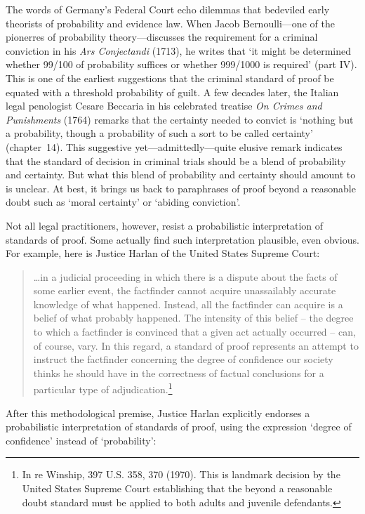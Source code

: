 \documentclass[10pt,dvipsnames,enabledeprecatedfontcommands]{scrartcl}
\begin{document}
The words of Germany's Federal Court echo dilemmas that bedeviled early
theorists of probability and evidence law. When Jacob Bernoulli---one of
the pionerres of probability theory---discusses the requirement for a
criminal conviction in his \textit{Ars Conjectandi} (1713), he writes
that `it might be determined whether 99/100 of probability suffices or
whether 999/1000 is required' (part IV). This is one of the earliest
suggestions that the criminal standard of proof be equated with a
threshold probability of guilt. A few decades later, the Italian legal
penologist Cesare Beccaria in his celebrated treatise
\textit{On Crimes and Punishments} (1764) remarks that the certainty
needed to convict is `nothing but a probability, though a probability of
such a sort to be called certainty' (chapter~14). This suggestive
yet---admittedly---quite elusive remark indicates that the standard of
decision in criminal trials should be a blend of probability and
certainty. But what this blend of probability and certainty should
amount to is unclear. At best, it brings us back to paraphrases of proof
beyond a reasonable doubt such as `moral certainty' or `abiding
conviction'.

Not all legal practitioners, however, resist a probabilistic
interpretation of standards of proof. Some actually find such
interpretation plausible, even obvious. For example, here is Justice
Harlan of the United States Supreme Court:

\begin{quote}
\dots in a judicial proceeding in which there is a dispute about the facts of some earlier event, the factfinder cannot acquire unassailably accurate knowledge of what happened. Instead, all the factfinder can acquire is a belief of what probably happened. The intensity of this belief -- the degree to which a factfinder is convinced that a given act actually occurred -- can, of course, vary. In this regard, a standard of proof represents an attempt to instruct the factfinder concerning the degree of confidence our society thinks he should have in the correctness of factual conclusions for a particular type of adjudication.\footnote{In re Winship, 397 U.S. 358, 370 (1970). This is landmark decision by the United States Supreme Court establishing  that the beyond a reasonable doubt standard must be applied to both adults and juvenile defendants.}
\end{quote}

\noindent After this methodological premise, Justice Harlan explicitly
endorses a probabilistic interpretation of standards of proof, using the
expression `degree of confidence' instead of `probability':
\end{document}
